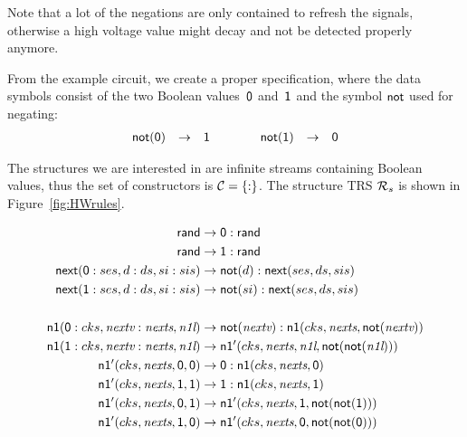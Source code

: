 \documentclass{eptcs}
\begin{document}
Note that a lot of the negations are only contained to refresh the signals,
otherwise a high voltage value might decay and not be detected properly anymore.

From the example circuit, we create a proper specification, where the data
symbols consist of the two Boolean values~$\mathsf{0}$ and~$\mathsf{1}$ and the symbol
$\mathsf{not}$ used for negating:
\[
\begin{array}{rcl@{\qquad\qquad}rcl}
\fsym{not}(\zero) &\to& \one
&
\fsym{not}(\one) &\to& \zero
\end{array}
\]

The structures we are interested in are infinite streams containing Boolean
values, thus the set of constructors is $\mathcal{C} = \{ {:} \}$. The structure
TRS $\mathcal{R}_s$ is shown in Figure~\ref{fig:HWrules}.

\begin{figure}[t]
\centering
\begin{align*}
  \fsym{rand} &\to \zero : \fsym{rand}
\\
  \fsym{rand} &\to \one : \fsym{rand}
\\
  \fsym{next}(\zero : ses,d : ds,si : sis) &\to
        \fsym{not}(d) : \fsym{next}(ses,ds,sis)
\\
  \fsym{next}(\one : ses,d : ds,si : sis) &\to
        \fsym{not}(si) : \fsym{next}(ses,ds,sis)
\\
\\
  \fsym{n1}(\zero : cks,\textit{nextv} : \textit{nexts},\textit{n1l})
&\to
    \fsym{not}(\textit{nextv}) : \fsym{n1}(cks,\textit{nexts},
                                                \fsym{not}(\textit{nextv}))
\\
  \fsym{n1}(\one : cks,\textit{nextv} : \textit{nexts},\textit{n1l})
&\to
            \fsym{n1}'(cks,\textit{nexts},\textit{n1l},
                    \fsym{not}(\fsym{not}(\textit{n1l})))
\\
  \fsym{n1}'(cks,\textit{nexts},\zero,\zero)
&\to
    \zero : \fsym{n1}(cks,\textit{nexts},\zero)
\\
  \fsym{n1}'(cks,\textit{nexts},\one,\one)
&\to
    \one : \fsym{n1}(cks,\textit{nexts},\one)
\\
  \fsym{n1}'(cks,\textit{nexts},\zero,\one)
&\to
        \fsym{n1}'(cks,\textit{nexts},\one,\fsym{not}(\fsym{not}(\one)))
\\
  \fsym{n1}'(cks,\textit{nexts},\one,\zero)
&\to
        \fsym{n1}'(cks,\textit{nexts},\zero,\fsym{not}(\fsym{not}(\zero)))
\\
\\

\end{align*}
\end{figure}
\end{document}
